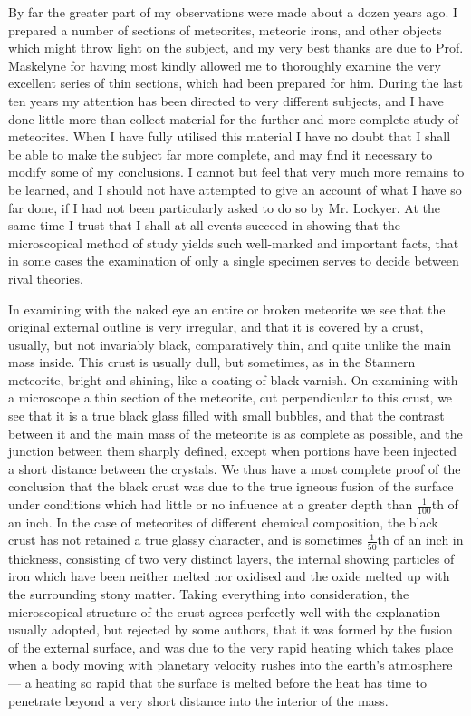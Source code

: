 \documentclass[a4paper, 12pt, oneside]{article}
\begin{document}
By far the greater part of my observations were made about a dozen years ago. I prepared a number of sections of meteorites, meteoric irons, and other objects which might throw light on the subject, and my very best thanks are due to Prof. Maskelyne for having most kindly allowed me to thoroughly examine the very excellent series of thin sections, which had been prepared for him. During the last ten years my attention has been directed to very different subjects, and I have done little more than collect material for the further and more complete study of meteorites. When I have fully utilised this material I have no doubt that I shall be able to make the subject far more complete, and may find it necessary to modify some of my conclusions. I cannot but feel that very much more remains to be learned, and I should not have attempted to give an account of what I have so far done, if I had not been particularly asked to do so by Mr. Lockyer. At the same time I trust that I shall at all events succeed in showing that the microscopical method of study yields such well-marked and important facts, that in some cases the examination of only a single specimen serves to decide between rival theories.

In examining with the naked eye an entire or broken meteorite we see that the original external outline is very irregular, and that it is covered by a crust, usually, but not invariably black, comparatively thin, and quite unlike the main mass inside. This crust is usually dull, but sometimes, as in the Stannern meteorite, bright and shining, like a coating of black varnish. On examining with a microscope a thin section of the meteorite, cut perpendicular to this crust, we see that it is a true black glass filled with small bubbles, and that the contrast between it and the main mass of the meteorite is as complete as possible, and the junction between them sharply defined, except when portions have been injected a short distance between the crystals. We thus have a most complete proof of the conclusion that the black crust was due to the true igneous fusion of the surface under conditions which had little or no influence at a greater depth than $\frac{1}{100}$th of an inch. In the case of meteorites of different chemical composition, the black crust has not retained a true glassy character, and is sometimes $\frac{1}{50}$th of an inch in thickness, consisting of two very distinct layers, the internal showing particles of iron which have been neither melted nor oxidised and the oxide melted up with the surrounding stony matter. Taking everything into consideration, the microscopical structure of the crust agrees perfectly well with the explanation usually adopted, but rejected by some authors, that it was formed by the fusion of the external surface, and was due to the very rapid heating which takes place when a body moving with planetary velocity rushes into the earth's atmosphere --- a heating so rapid that the surface is melted before the heat has time to penetrate beyond a very short distance into the interior of the mass.
\end{document}
